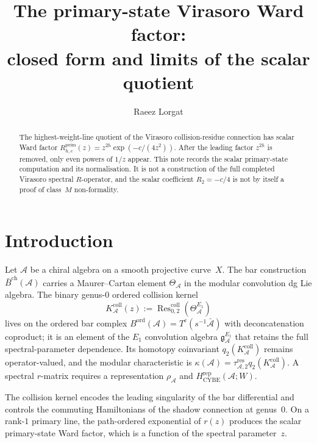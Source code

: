 \documentclass[11pt]{article}
\theoremstyle{definition}
\theoremstyle{remark}
\newcommand{\cA}{\mathcal{A}}
\newcommand{\barB}{\bar{B}}
\newcommand{\Res}{\operatorname{Res}}
\numberwithin{equation}{section}
\begin{document}
\title{The primary-state Virasoro Ward factor:\\
closed form and limits of the scalar quotient}

\author{Raeez Lorgat}
\date{}

\maketitle

\begin{abstract}
The highest-weight-line quotient of the Virasoro collision-residue
connection has scalar Ward factor
$R^{\mathrm{prim}}_{h,c}(z)=z^{2h}\exp(-c/(4z^2))$.  After the
leading factor $z^{2h}$ is removed, only even powers of $1/z$ appear.
This note records the scalar primary-state computation and its
normalisation.  It is not a construction of the full completed
Virasoro spectral $R$-operator, and the scalar coefficient
$R_2=-c/4$ is not by itself a proof of class~$M$ non-formality.
\end{abstract}

\section{Introduction}\label{sec:intro}

Let $\cA$ be a chiral algebra on a smooth projective curve~$X$. The
bar construction $\barB^{\mathrm{ch}}(\cA)$ carries a Maurer--Cartan
element $\Theta_\cA$ in the modular convolution dg Lie algebra. The
binary genus-$0$ ordered collision kernel
\begin{equation}\label{eq:collision-residue}
K_\cA^{\mathrm{coll}}(z)
:=\Res^{\mathrm{coll}}_{0,2}(\Theta_\cA^{E_1})
\end{equation}
lives
on the ordered bar complex
$B^{\mathrm{ord}}(\cA) = T^c(s^{-1}\bar{\cA})$ with deconcatenation
coproduct; it is an element of the $E_1$ convolution algebra
$\mathfrak{g}^{E_1}_\cA$ that retains the full spectral-parameter
dependence. Its homotopy coinvariant
$q_2(K_\cA^{\mathrm{coll}})$ remains operator-valued, and the modular
characteristic is
$\kappa(\cA)=\tau_{\cA,2}^{\mathrm{res}}
q_2(K_\cA^{\mathrm{coll}})$. A spectral $r$-matrix requires a
representation $\rho_\cA$ and
$H_{\mathrm{CYBE}}^{\mathrm{rep}}(\cA;W)$.

The collision kernel encodes the leading
singularity of the bar differential and controls the commuting
Hamiltonians of the shadow connection at genus~$0$. On a rank-$1$
primary line, the path-ordered exponential of $r(z)$ produces the
scalar primary-state Ward factor, which is a function of the spectral
parameter~$z$.
\end{document}
